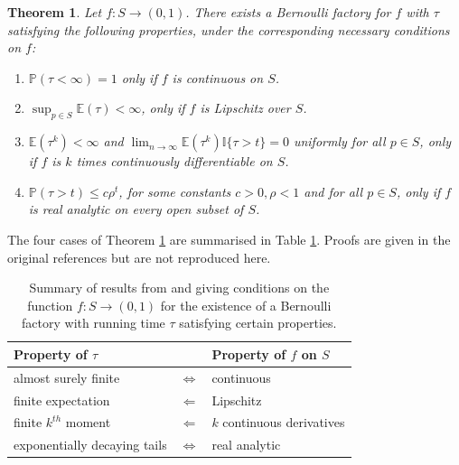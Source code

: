 \documentclass{article}
\newtheorem{thm}{Theorem}
\theoremstyle{definition}
\newcommand{\PR}{\mathbb{P}}
\newcommand{\E}{\mathbb{E}}
\begin{document}
\begin{thm}\label{thm:nacu_peres}
Let $f:S\to(0,1)$. 
There exists a Bernoulli factory for $f$ with $\tau$ satisfying the following properties, under the corresponding necessary conditions on $f$:
\begin{enumerate}[label=(\alph*)]
\item \label{thm:nplike_terminates_as} \textup{\citep{keane1994}} $\PR(\tau <\infty)=1$ only if $f$ is continuous on $S$.
\item \label{thm:np_finite_mean} \textup{\citep[Proposition 23]{nacu2005}} $\sup_{p\in S} \E(\tau) <\infty$, only if $f$ is Lipschitz over $S$. 
\item \label{thm:np_kth_moment} \textup{\citep[Proposition 22]{nacu2005}} $\E(\tau ^k)<\infty$ and $\lim_{n\to\infty} \E(\tau^k)\mathbb{I}\{\tau>t\} =0$ uniformly for all $p\in S$, only if $f$ is $k$ times continuously differentiable on $S$.
\item \label{thm:np_exponential_tails} \textup{\citep[Theorem 2]{nacu2005}} $\PR(\tau >t) \leq c\rho^t$, for some constants $c>0, \rho<1$ and for all $p\in S$, only if $f$ is real analytic on every open subset of $S$. %
\end{enumerate}
\end{thm}
The four cases of Theorem \ref{thm:nacu_peres} are summarised in Table \ref{tab:theorems_summary}. Proofs are given in the original references but are not reproduced here.

\begin{table}
\centering
\begin{tabular}{l c l}
Property of $\tau$ & & Property of $f$ on $S$ \\
\hline
almost surely finite & $\Leftrightarrow$ & continuous \\
finite expectation & $\Leftarrow$ & Lipschitz \\
finite $k^{th}$ moment & $\Leftarrow$ & $k$ continuous derivatives \\
exponentially decaying tails & $\Leftrightarrow$ & real analytic
\end{tabular}
\caption{Summary of results from \citet{keane1994} and \citet{nacu2005} giving conditions on the function $f:S\to(0,1)$ for the existence of a Bernoulli factory with running time $\tau$ satisfying certain properties.}
\label{tab:theorems_summary}
\end{table}
\end{document}
